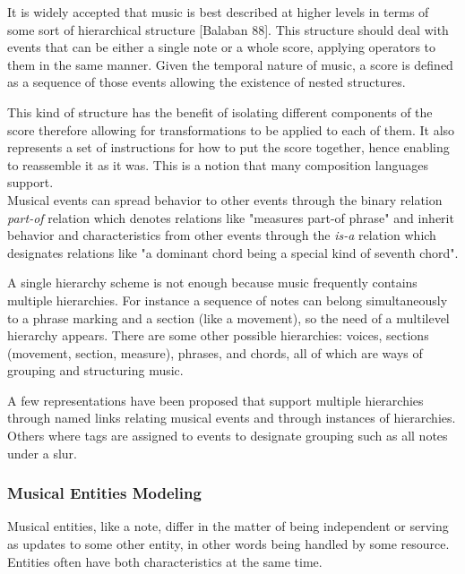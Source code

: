 \documentclass[main.tex]{files}
\begin{document}
    It is widely accepted that music is best described at higher levels in terms of some sort
    of hierarchical structure [Balaban 88]. This structure should deal with events that can be
    either a single note or a whole score, applying operators to them in the same manner. Given
    the temporal nature of music, a score is defined as a sequence of those events allowing
    the existence of nested structures.

    This kind of structure has the benefit of isolating different components of the score
    therefore allowing for transformations to be applied to each of them. It also represents a
    set of instructions for how to put the score together, hence enabling to reassemble it as
    it was. This is a notion that many composition languages support.\\
    Musical events can spread behavior to other events through the binary relation \textit{part-of}
    relation which denotes relations like "measures part-of phrase" and inherit behavior and
    characteristics from other events through the \textit{is-a} relation which designates relations
    like "a dominant chord being a special kind of seventh chord".\cite{Honing1993}

    A single hierarchy scheme is not enough because music frequently contains multiple hierarchies.
    For instance a sequence of notes can belong simultaneously to a phrase marking and a section
    (like a movement), so the need of a multilevel hierarchy appears. There are some other possible
    hierarchies: voices, sections (movement, section, measure), phrases, and chords, all of which
    are ways of grouping and structuring music.

    A few representations have been proposed that support multiple hierarchies through named
    links relating musical events and through instances of hierarchies. Others where tags are
    assigned to events to designate grouping such as all notes under a slur.

\subsubsection{Musical Entities Modeling}

    Musical entities, like a note, differ in the matter of being independent or serving as updates
    to some other entity, in other words being handled by some resource. Entities often have both
    characteristics at the same time.
\end{document}
